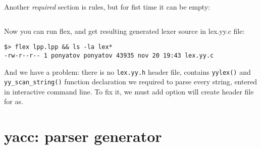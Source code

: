 \clearpage
Another \emph{required} section is rules, but for fist time it can be empty:
\begin{lstlisting}[title={lpp.lpp}]
%%
\end{lstlisting}

\noindent
Now you can run flex, and get resulting generated lexer source in lex.yy.c file:
\begin{lstlisting}
$> flex lpp.lpp && ls -la lex*
-rw-r--r-- 1 ponyatov ponyatov 43935 nov 20 19:43 lex.yy.c
\end{lstlisting}
And we have a problem: there is no \verb|lex.yy.h| header file, contains
\verb|yylex()| and \verb|yy_scan_string()| function declaration we required to
parse every string, entered in interactive command line. To fix it, we must add option will create header file for as.

\section{yacc: parser generator}
